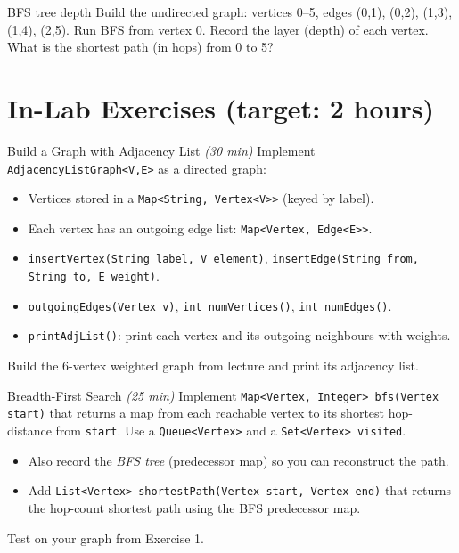 \documentclass[11pt]{article}
\begin{document}
\begin{tryit}{BFS tree depth}
Build the undirected graph: vertices 0--5, edges (0,1), (0,2), (1,3), (1,4), (2,5).
Run BFS from vertex 0. Record the layer (depth) of each vertex.
What is the shortest path (in hops) from 0 to 5?
\end{tryit}

\section*{In-Lab Exercises (target: 2 hours)}

\begin{labexercise}{Build a Graph with Adjacency List \hfill {\small \itshape (30 min)}}
Implement \texttt{AdjacencyListGraph<V,E>} as a directed graph:
\begin{itemize}[leftmargin=*,nosep]
  \item Vertices stored in a \texttt{Map<String, Vertex<V>>} (keyed by label).
  \item Each vertex has an outgoing edge list: \texttt{Map<Vertex, Edge<E>>}.
  \item \texttt{insertVertex(String label, V element)}, \texttt{insertEdge(String from, String to, E weight)}.
  \item \texttt{outgoingEdges(Vertex v)}, \texttt{int numVertices()}, \texttt{int numEdges()}.
  \item \texttt{printAdjList()}: print each vertex and its outgoing neighbours with weights.
\end{itemize}
Build the 6-vertex weighted graph from lecture and print its adjacency list.
\end{labexercise}

\begin{labexercise}{Breadth-First Search \hfill {\small \itshape (25 min)}}
Implement \texttt{Map<Vertex, Integer> bfs(Vertex start)} that returns a map from each
reachable vertex to its shortest hop-distance from \texttt{start}.
Use a \texttt{Queue<Vertex>} and a \texttt{Set<Vertex> visited}.
\begin{itemize}[leftmargin=*,nosep]
  \item Also record the \emph{BFS tree} (predecessor map) so you can reconstruct the path.
  \item Add \texttt{List<Vertex> shortestPath(Vertex start, Vertex end)} that
        returns the hop-count shortest path using the BFS predecessor map.
\end{itemize}
Test on your graph from Exercise 1.
\end{labexercise}
\end{document}
